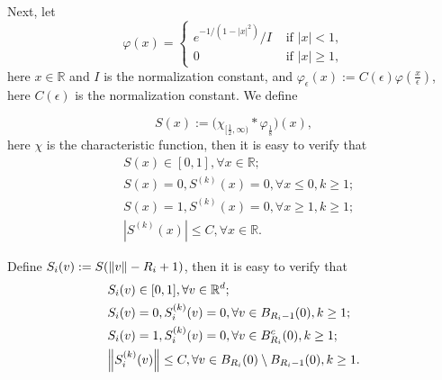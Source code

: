 \documentclass[a4paper, 11pt]{article}
\theoremstyle{plain}
\theoremstyle{remark}
\theoremstyle{definition}
\begin{document}
		Next, let 
		\begin{equation}
			\varphi(x)= \begin{cases}e^{-1 /\left(1-|x|^2\right)} / I & \text { if }|x|<1, \\ 0 & \text { if }|x| \geq 1,\end{cases}
		\end{equation}
		here $x\in\mathbb{R}$ and $I$ is the normalization constant, and $\varphi_\epsilon(x):=C(\epsilon)\varphi(\frac{x}{\epsilon})$, here $C(\epsilon)$ is the normalization constant.   We define 
		
		
		\begin{equation}
			S(x):=\Big(\chi_{[\frac{1}{2},\infty)}*\varphi_{\frac{1}{8}}\Big)(x),
		\end{equation}
		here $\chi$ is the characteristic function, then it is easy to verify that
		\begin{eqnarray}
			&S(x)\in [0,1], \forall x\in \mathbb{R};\\
			&S(x)=0, S^{(k)}(x)=0, \forall x\leq 0, k\geq 1;\\
			&S(x)=1,S^{(k)}(x)=0,\forall x\geq 1, k\geq 1;\\
			&|S^{(k)}(x)|\leq C, \forall x\in \mathbb{R}.
		\end{eqnarray}
		
		Define $S_i(v):=S(\norm{v}-R_i+1)$, then it is easy to verify that 
		\begin{eqnarray}
			&S_i(v)\in [0,1], \forall v\in \mathbb{R}^d;\\
			&S_i(v)=0, S_i^{(k)}(v)=0, \forall v\in B_{R_i-1}(0), k\geq 1;\\
			&S_i(v)=1,S_i^{(k)}(v)=0,\forall v\in B^c_{R_i}(0), k\geq 1;\\
			&\norm{S_i^{(k)}(v)}\leq C, \forall v\in B_{R_i}(0)\setminus B_{R_i-1}(0),k\geq 1.
		\end{eqnarray}
		
\end{document}
